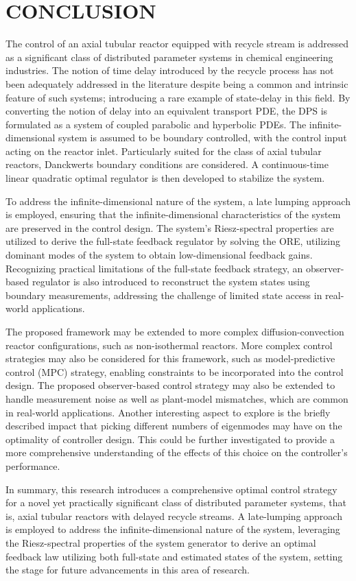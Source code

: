 \section{CONCLUSION}

The control of an axial tubular reactor equipped with recycle stream is addressed as a significant class of distributed parameter systems in chemical engineering industries. The notion of time delay introduced by the recycle process has not been adequately addressed in the literature despite being a common and intrinsic feature of such systems; introducing a rare example of state-delay in this field. By converting the notion of delay into an equivalent transport PDE, the DPS is formulated as a system of coupled parabolic and hyperbolic PDEs. The infinite-dimensional system is assumed to be boundary controlled, with the control input acting on the reactor inlet. Particularly suited for the class of axial tubular reactors, Danckwerts boundary conditions are considered. A continuous-time linear quadratic optimal regulator is then developed to stabilize the system.

To address the infinite-dimensional nature of the system, a late lumping approach is employed, ensuring that the infinite-dimensional characteristics of the system are preserved in the control design. The system's Riesz-spectral properties are utilized to derive the full-state feedback regulator by solving the ORE, utilizing dominant modes of the system to obtain low-dimensional feedback gains. Recognizing practical limitations of the full-state feedback strategy, an observer-based regulator is also introduced to reconstruct the system states using boundary measurements, addressing the challenge of limited state access in real-world applications.

The proposed framework may be extended to more complex diffusion-convection reactor configurations, such as non-isothermal reactors. More complex control strategies may also be considered for this framework, such as model-predictive control (MPC) strategy, enabling constraints to be incorporated into the control design. The proposed observer-based control strategy may also be extended to handle measurement noise as well as plant-model mismatches, which are common in real-world applications. Another interesting aspect to explore is the briefly described impact that picking different numbers of eigenmodes may have on the optimality of controller design. This could be further investigated to provide a more comprehensive understanding of the effects of this choice on the controller's performance.

In summary, this research introduces a comprehensive optimal control strategy for a novel yet practically significant class of distributed parameter systems, that is, axial tubular reactors with delayed recycle streams. A late-lumping approach is employed to address the infinite-dimensional nature of the system, leveraging the Riesz-spectral properties of the system generator to derive an optimal feedback law utilizing both full-state and estimated states of the system, setting the stage for future advancements in this area of research.